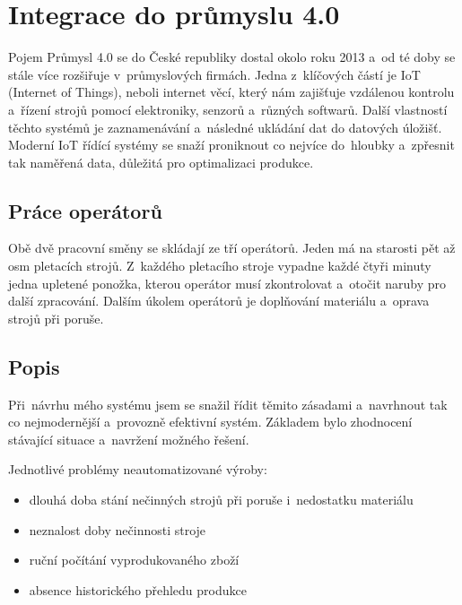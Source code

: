 \chapter{Integrace do průmyslu 4.0}
Pojem Průmysl 4.0 se do České republiky dostal okolo roku 2013 a~od té doby se stále více rozšiřuje v~průmyslových firmách.
Jedna z~klíčových částí je IoT (Internet of Things), neboli internet věcí, který nám zajišťuje vzdálenou kontrolu a~řízení strojů pomocí elektroniky, senzorů a~různých softwarů.
Další vlastností těchto systémů je zaznamenávání a~následné ukládání dat do datových úložišť.
Moderní IoT řídící systémy se snaží proniknout co nejvíce do~hloubky a~zpřesnit tak naměřená data, důležitá pro optimalizaci produkce.   

\section{Práce operátorů}

Obě dvě pracovní směny se skládají ze tří operátorů. Jeden má na starosti pět až osm pletacích strojů.
Z~každého pletacího stroje vypadne každé čtyři minuty jedna upletené ponožka, kterou operátor musí zkontrolovat a~otočit naruby pro další zpracování.
Dalším úkolem operátorů je doplňování materiálu a~oprava strojů při poruše.

\section{Popis}
Při~návrhu mého systému jsem se snažil řídit těmito zásadami a~navrhnout tak co nejmodernější a~provozně efektivní systém.
Základem bylo zhodnocení stávající situace a~navržení možného řešení.

Jednotlivé problémy neautomatizované výroby:
\begin{itemize}
    \item dlouhá doba stání nečinných strojů při poruše i~nedostatku materiálu
    \item neznalost doby nečinnosti stroje
    \item ruční počítání vyprodukovaného zboží
    \item absence historického přehledu produkce
\end{itemize}


